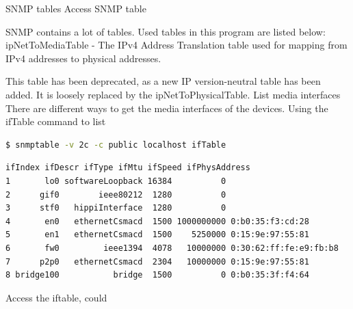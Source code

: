 SNMP tables
Access SNMP table

SNMP contains a lot of tables.
Used tables in this program are listed below:
ipNetToMediaTable - The IPv4 Address Translation table used for mapping from
IPv4 addresses to physical addresses.

This table has been deprecated, as a new IP version-neutral table has been added. It is loosely replaced by the ipNetToPhysicalTable.
List media interfaces
There are different ways to get the media interfaces of the devices.
Using the ifTable command to list

\begin{lstlisting}[language=bash]
$ snmptable -v 2c -c public localhost ifTable
\end{lstlisting}

\begin{lstlisting}[caption={iptables contains too many fields, so it is too long to be displayed as normal source code. The following fields are not important, so they are displayed here: ifAdminStatus ifOperStatus  ifLastChange ifInOctets ifInUcastPkts ifInNUcastPkts ifInDiscards ifInErrors ifInUnknownProtos ifOutOctets ifOutUcastPkts ifOutNUcastPkts ifOutDiscards ifOutErrors ifOutQLen ifSpecific}]
ifIndex ifDescr ifType ifMtu ifSpeed ifPhysAddress
1       lo0 softwareLoopback 16384          0            
2      gif0        ieee80212  1280          0   
3      stf0   hippiInterface  1280          0    
4       en0   ethernetCsmacd  1500 1000000000 0:b0:35:f3:cd:28
5       en1   ethernetCsmacd  1500    5250000 0:15:9e:97:55:81
6       fw0         ieee1394  4078   10000000 0:30:62:ff:fe:e9:fb:b8
7      p2p0   ethernetCsmacd  2304   10000000 0:15:9e:97:55:81
8 bridge100           bridge  1500          0 0:b0:35:3f:f4:64 
\end{lstlisting}

Access the iftable, could 




\subsection{}